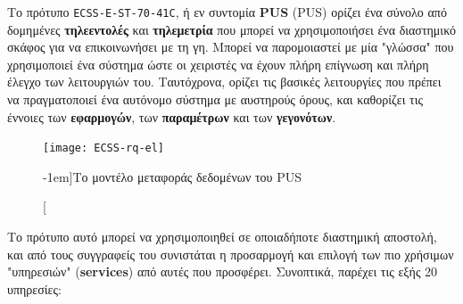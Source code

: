 \documentclass[a4paper,nobib]{tufte-book}
\begin{document}
Το πρότυπο \texttt{ECSS-E-ST-70-41C}, ή εν συντομία \textbf{\acs{PUS}} (\acl{PUS}) ορίζει ένα σύνολο από δομημένες \textbf{τηλεεντολές} και \textbf{τηλεμετρία} που μπορεί να χρησιμοποιήσει ένα διαστημικό σκάφος για να επικοινωνήσει με τη γη. Μπορεί να παρομοιαστεί με μία "γλώσσα" που χρησιμοποιεί ένα σύστημα ώστε οι χειριστές να έχουν πλήρη επίγνωση και πλήρη έλεγχο των λειτουργιών του. Ταυτόχρονα, ορίζει τις βασικές λειτουργίες που πρέπει να πραγματοποιεί ένα αυτόνομο σύστημα με αυστηρούς όρους, και καθορίζει τις έννοιες των \textbf{εφαρμογών}, των \textbf{παραμέτρων} και των \textbf{γεγονότων}.

\begin{figure}
	\texttt{[image: ECSS-rq-el]}
	\caption[][-1em]{Το μοντέλο μεταφοράς δεδομένων του \ac{PUS}}
	\label{fig:pusmodel}
\end{figure}

Το πρότυπο αυτό μπορεί να χρησιμοποιηθεί σε οποιαδήποτε διαστημική αποστολή, και από τους συγγραφείς του συνιστάται η προσαρμογή και επιλογή των πιο χρήσιμων "υπηρεσιών" (\textbf{services}) από αυτές που προσφέρει. Συνοπτικά, παρέχει τις εξής 20 υπηρεσίες: \autocite{ECSS-E-ST-70-41C,ECSS-E-70-41A,kaufeler_esa_standard_1994}

\end{document}
